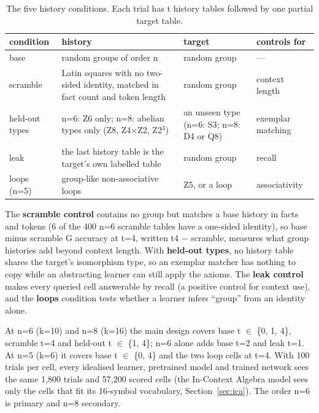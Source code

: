 \documentclass[11pt]{article}
\begin{document}
\begin{table}[tbp]
\centering
\small
\caption{The five history conditions. Each trial has t history tables followed by one partial target table.}\label{tab:conditions}
\begin{tabularx}{\linewidth}{@{}>{\raggedright\arraybackslash\hsize=0.4704\hsize}X>{\raggedright\arraybackslash\hsize=2.1136\hsize}X>{\raggedright\arraybackslash\hsize=0.7530\hsize}X>{\raggedright\arraybackslash\hsize=0.6630\hsize}X@{}}
\toprule
condition & history & target & controls for \\
\midrule
base & random groups of order n & random group & --- \\
scramble & Latin squares with no two-sided identity, matched in fact count and token length & random group & context length \\
held-out types & n=6: Z6 only; n=8: abelian types only (Z8, Z4$\times$Z2, Z2$^{3}$) & an unseen type (n=6: S3; n=8: D4 or Q8) & exemplar matching \\
leak & the last history table is the target's own labelled table & random group & recall \\
loops (n=5) & group-like non-associative loops & Z5, or a loop & associativity \\
\bottomrule
\end{tabularx}
\end{table}

The \textbf{scramble control} contains no group but matches a base history in facts and tokens (6 of the 400 n=6 scramble tables have a one-sided identity), so base minus scramble G accuracy at t=4, written t4 $-$ scramble, measures what group histories add beyond context length. With \textbf{held-out types}, no history table shares the target's isomorphism type, so an exemplar matcher has nothing to copy while an abstracting learner can still apply the axioms. The \textbf{leak control} makes every queried cell answerable by recall (a positive control for context use), and the \textbf{loops} condition tests whether a learner infers ``group'' from an identity alone.

At n=6 (k=10) and n=8 (k=16) the main design covers base t $\in$ \{0, 1, 4\}, scramble t=4 and held-out t $\in$ \{1, 4\}; n=6 alone adds base t=2 and leak t=1. At n=5 (k=6) it covers base t $\in$ \{0, 4\} and the two loop cells at t=4. With 100 trials per cell, every idealised learner, pretrained model and trained network sees the same 1,800 trials and 57,200 scored cells (the In-Context Algebra model sees only the cells that fit its 16-symbol vocabulary, Section~\ref{sec:ica}). The order n=6 is primary and n=8 secondary.
\end{document}
